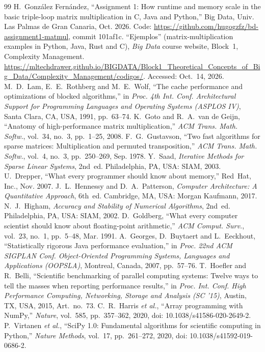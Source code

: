 \begin{thebibliography}{99}
 H.~Gonz\'alez Fern\'andez, ``Assignment 1: How runtime and memory scale in the basic triple-loop matrix multiplication in C, Java and Python,'' Big Data, Univ. Las Palmas de Gran Canaria, Oct. 2026. Code: \url{https://github.com/hugogzfz/bd-assignment1-matmul}, commit 101af1c.
 ``Ejemplos'' (matrix-multiplication examples in Python, Java, Rust and C), \emph{Big Data} course website, Block~1, Complexity Management. \url{https://mltechdrawer.github.io/BIGDATA/Block1_Theoretical_Concepts_of_Big_Data/Complexity_Management/codigos/}. Accessed: Oct.~14, 2026.
 M.~D.~Lam, E.~E.~Rothberg and M.~E.~Wolf, ``The cache performance and optimizations of blocked algorithms,'' in \emph{Proc. 4th Int. Conf. Architectural Support for Programming Languages and Operating Systems (ASPLOS IV)}, Santa Clara, CA, USA, 1991, pp.~63--74.
 K.~Goto and R.~A.~van de Geijn, ``Anatomy of high-performance matrix multiplication,'' \emph{ACM Trans. Math. Softw.}, vol.~34, no.~3, pp.~1--25, 2008.
 F.~G.~Gustavson, ``Two fast algorithms for sparse matrices: Multiplication and permuted transposition,'' \emph{ACM Trans. Math. Softw.}, vol.~4, no.~3, pp.~250--269, Sep. 1978.
 Y.~Saad, \emph{Iterative Methods for Sparse Linear Systems}, 2nd~ed. Philadelphia, PA, USA: SIAM, 2003.
 U.~Drepper, ``What every programmer should know about memory,'' Red~Hat, Inc., Nov. 2007.
 J.~L.~Hennessy and D.~A.~Patterson, \emph{Computer Architecture: A Quantitative Approach}, 6th~ed. Cambridge, MA, USA: Morgan Kaufmann, 2017.
 N.~J.~Higham, \emph{Accuracy and Stability of Numerical Algorithms}, 2nd~ed. Philadelphia, PA, USA: SIAM, 2002.
 D.~Goldberg, ``What every computer scientist should know about floating-point arithmetic,'' \emph{ACM Comput. Surv.}, vol.~23, no.~1, pp.~5--48, Mar. 1991.
 A.~Georges, D.~Buytaert and L.~Eeckhout, ``Statistically rigorous Java performance evaluation,'' in \emph{Proc. 22nd ACM SIGPLAN Conf. Object-Oriented Programming Systems, Languages and Applications (OOPSLA)}, Montreal, Canada, 2007, pp.~57--76.
 T.~Hoefler and R.~Belli, ``Scientific benchmarking of parallel computing systems: Twelve ways to tell the masses when reporting performance results,'' in \emph{Proc. Int. Conf. High Performance Computing, Networking, Storage and Analysis (SC '15)}, Austin, TX, USA, 2015, Art.~no.~73.
 C.~R.~Harris \emph{et al.}, ``Array programming with NumPy,'' \emph{Nature}, vol.~585, pp.~357--362, 2020, doi: 10.1038/s41586-020-2649-2.
 P.~Virtanen \emph{et al.}, ``SciPy 1.0: Fundamental algorithms for scientific computing in Python,'' \emph{Nature Methods}, vol.~17, pp.~261--272, 2020, doi: 10.1038/s41592-019-0686-2.
\end{thebibliography}
